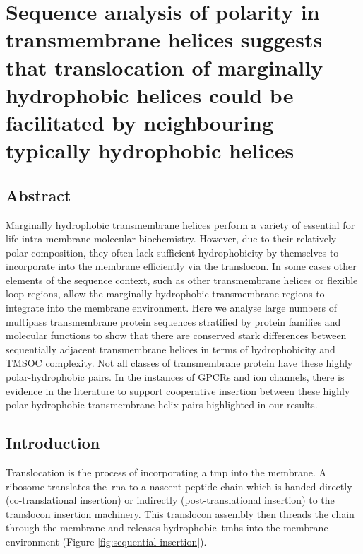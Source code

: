 \chapter{Sequence analysis of polarity in transmembrane helices suggests that translocation of marginally hydrophobic helices could be facilitated by neighbouring typically hydrophobic helices}

\sloppy

\section{Abstract}

Marginally hydrophobic transmembrane helices perform a variety of essential for life intra-membrane molecular biochemistry.
However, due to their relatively polar composition, they often lack sufficient hydrophobicity by themselves to incorporate into the membrane efficiently via the translocon.
In some cases other elements of the sequence context, such as other transmembrane helices or flexible loop regions, allow the marginally hydrophobic transmembrane regions to integrate into the membrane environment.
Here we analyse large numbers of multipass transmembrane protein sequences stratified by protein families and molecular functions to show that there are conserved stark differences between sequentially adjacent transmembrane helices in terms of hydrophobicity and TMSOC complexity.
Not all classes of transmembrane protein have these highly polar\--hydrophobic pairs.
In the instances of GPCRs and ion channels, there is evidence in the literature to support cooperative insertion between these highly polar\--hydrophobic transmembrane helix pairs highlighted in our results.


\section{Introduction}

Translocation is the process of incorporating a \gls{tmp} into the membrane.
A ribosome translates the~\gls{rna} to a nascent peptide chain which is handed directly (co-translational insertion) or indirectly (post\--translational insertion) to the translocon insertion machinery.
This translocon assembly then threads the chain through the membrane and releases hydrophobic~\gls{tmh}s into the membrane environment (Figure \ref{fig:sequential-insertion}).

